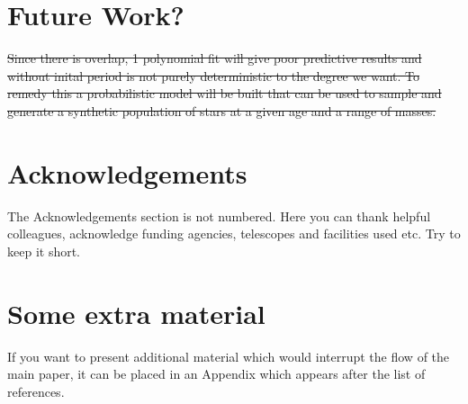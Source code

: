 \documentclass[fleqn,usenatbib]{mnras}
\begin{document}
\section{Future Work?}
\sout{Since there is overlap, 1 polynomial fit will give poor predictive results and without inital period is not purely deterministic to the degree we want.
	To remedy this a probabilistic model will be built that can be used to sample and generate a synthetic population of stars at a given age and a range of masses.}

\section*{Acknowledgements}

The Acknowledgements section is not numbered. Here you can thank helpful
colleagues, acknowledge funding agencies, telescopes and facilities used etc.
Try to keep it short.








\appendix

\section{Some extra material}

If you want to present additional material which would interrupt the flow of the main paper,
it can be placed in an Appendix which appears after the list of references.



\bsp	%
\label{lastpage}
\end{document}
